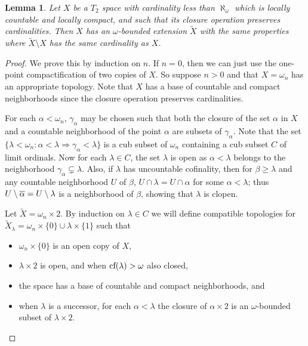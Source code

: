 \documentclass{amsart}
\theoremstyle{plain}
\newtheorem{lemma}[theorem]{Lemma}
\theoremstyle{definition}
\theoremstyle{remark}
\theoremstyle{plain}
\theoremstyle{definition}
\theoremstyle{remark}
\begin{document}
  \begin{lemma}
    Let \(X\) be a \(T_2\) space with cardinality less than \(\aleph_\omega\)
    which is locally countable and locally compact, and such that
    its closure operation preserves cardinalities.
    Then \(X\) has an \(\omega\)-bounded extension \(\tilde X\)
    with the same properties where \(\tilde X\setminus X\) has the same
    cardinality as \(X\).
  \end{lemma}

  \begin{proof}
    We prove this by induction on \(n\).
    If \(n=0\), then we can just use the one-point compactification of two
    copies of \(X\). So suppose \(n>0\) and
    that \(X=\omega_n\) has an appropriate topology. Note that \(X\) has
    a base of countable and compact neighborhoods since the closure operation
    preserves cardinalities.

    For each \(\alpha<\omega_n\), \(\gamma_\alpha\) may be chosen such that
    both the closure of the set \(\alpha\) in \(X\) and a countable
    neighborhood of the point \(\alpha\) are subsets of \(\gamma_\alpha\).
    Note that the set
    \(\{\lambda<\omega_n:\alpha<\lambda\Rightarrow\gamma_\alpha<\lambda\}\)
    is a cub subset of \(\omega_n\) containing a cub subset \(C\)
    of limit ordinals.
    Now for each \(\lambda\in C\), the set \(\lambda\) is
    open as \(\alpha<\lambda\) belongs to the neighborhood
    \(\gamma_\alpha\subsetneq\lambda\). Also, if \(\lambda\) has uncountable
    cofinality, then for \(\beta\geq\lambda\) and any countable neighborhood
    \(U\) of \(\beta\), \(U\cap\lambda=U\cap\alpha\)
    for some \(\alpha<\lambda\); thus \(U\setminus\overline{\alpha}=U\setminus\lambda\)
    is a neighborhood of \(\beta\), showing that \(\lambda\)
    is clopen.

    Let \(\tilde X=\omega_n\times 2\).
    By induction on \(\lambda \in C\) we will define compatible topologies
    for \(\tilde X_\lambda=\omega_n\times\{0\}\cup\lambda\times\{1\}\)
    such that
    \begin{itemize}
      \item \(\omega_n \times \{0\}\) is an open copy of \(X\),
      \item \(\lambda\times 2\) is open, and when \(\textrm{cf}(\lambda)>\omega\) also closed,
      \item the space has a base of countable and compact neighborhoods, and
      \item when \(\lambda\) is a successor,
        for each \(\alpha<\lambda\) the closure of \(\alpha\times 2\) is
        an \(\omega\)-bounded  subset of \(\lambda\times 2\).
    \end{itemize}


\end{proof}
\end{document}
